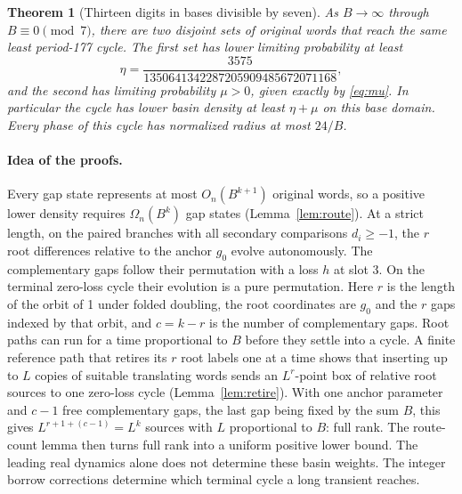 \documentclass[11pt,reqno]{amsart}
\newtheorem{theorem}{Theorem}
\theoremstyle{remark}
\begin{document}
\begin{theorem}[Thirteen digits in bases divisible by seven]\label{th:177}
As \(B\to\infty\) through \(B\equiv0\pmod 7\), there are two disjoint
sets of original words that reach the same least period-177 cycle.
The first set has lower limiting probability at least
\[
 \eta=\frac{3575}{1350641342287205909485672071168},
\]
and the second has limiting probability \(\mu>0\), given exactly by
\eqref{eq:mu}. In particular the cycle has lower basin density at
least \(\eta+\mu\) on this base domain. Every phase of this cycle has normalized radius at most \(24/B\).
\end{theorem}

\paragraph{Idea of the proofs.}
Every gap state represents at most \(O_n(B^{k+1})\) original words, so a
positive lower density requires \(\Omega_n(B^k)\) gap states
(Lemma~\ref{lem:route}). At a strict length, on the paired branches
with all secondary comparisons \(d_i\ge-1\), the \(r\) root differences
relative to the anchor \(g_0\) evolve autonomously. The complementary
gaps follow their permutation with a loss \(h\) at slot 3. On the
terminal zero-loss cycle their evolution is a pure permutation. Here
\(r\) is the length of the orbit of 1 under folded doubling, the root
coordinates are \(g_0\) and the \(r\) gaps indexed by that orbit, and
\(c=k-r\) is the number of complementary gaps. Root paths can run for a time
proportional to \(B\) before they settle into a cycle. A finite
reference path that retires its \(r\) root labels one at a time shows
that inserting up to \(L\) copies of suitable translating words sends
an \(L^r\)-point box of relative root sources to one zero-loss cycle
(Lemma~\ref{lem:retire}). With one anchor parameter and \(c-1\) free
complementary gaps, the last gap being fixed by the sum \(B\), this
gives \(L^{r+1+(c-1)}=L^k\) sources with \(L\) proportional to \(B\):
full rank. The route-count lemma then turns full rank into a uniform
positive lower bound. The leading real dynamics alone does not determine these basin weights.
The integer borrow corrections determine which terminal cycle a long
transient reaches.
\end{document}

